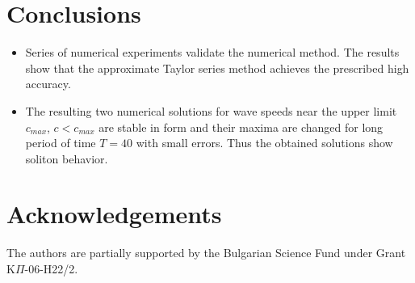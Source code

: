 \documentclass[a0,portrait]{a0poster}
\begin{document}
\begin{multicols}{2}

\color{SaddleBrown} %
\section*{Conclusions}

\begin{itemize}
\item Series of numerical experiments validate the numerical method. The results show that the approximate Taylor series method achieves the prescribed high accuracy. 
\item The resulting two numerical solutions for wave speeds near the upper limit $c_{max} $, $c < c_{max}$ are stable in form and  their maxima are changed for long period of time $T=40$ with small errors.  Thus the obtained solutions show soliton behavior. 
\end{itemize}
\color{DarkSlateGray} %
\nocite{*} %


\section*{Acknowledgements}

The authors are partially supported by the Bulgarian Science Fund under Grant K$\Pi$-06-H22/2.


\end{multicols}
\end{document}
